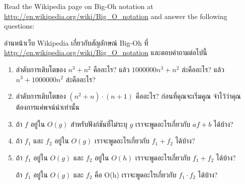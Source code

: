 \begin{exercise}

Read the Wikipedia page on Big-Oh notation at
\url{http://en.wikipedia.org/wiki/Big_O_notation} and
answer the following questions:

อ่านหน้าเว็บ Wikipedia เกี่ยวกับสัญลักษณ์ Big-Oh ที่ \url{http://en.wikipedia.org/wiki/Big_O_notation} และตอบคำถามต่อไปนี้

\begin{enumerate}

\item ลำดับการเติบโตของ $n^3 + n^2$ คืออะไร? 
แล้ว $1000000 n^3 + n^2$ ล่ะคืออะไร? 
แล้ว $n^3 + 1000000 n^2$ ล่ะคืออะไร? 


\item ลำดับการเติบโตของ $(n^2 + n) \cdot (n + 1)$ คืออะไร? ก่อนที่คุณจะเริ่มคูณ จำไว้ว่าคุณต้องการแค่พจน์นำเท่านั้น

  
\item ถ้า $f$ อยู่ใน $O(g)$ สำหรับฟังก์ชันที่ไม่ระบุ $g$ เราจะพูดอะไรเกี่ยวกับ $af+b$ ได้บ้าง?


\item ถ้า $f_1$ และ $f_2$ อยู่ใน $O(g)$ เราจะพูดอะไรเกี่ยวกับ $f_1 + f_2$ ได้บ้าง?


\item ถ้า $f_1$ อยู่ใน $O(g)$ และ $f_2$ อยู่ใน $O(h)$ เราจะพูดอะไรเกี่ยวกับ $f_1 + f_2$ ได้บ้าง?


ถ้า $f_1$ อยู่ใน $O(g)$ และ $f_2$ คือ O(h) เราจะพูดอะไรเกี่ยวกับ $f_1 \cdot f_2$ ได้บ้าง?

\end{enumerate}

\end{exercise}


